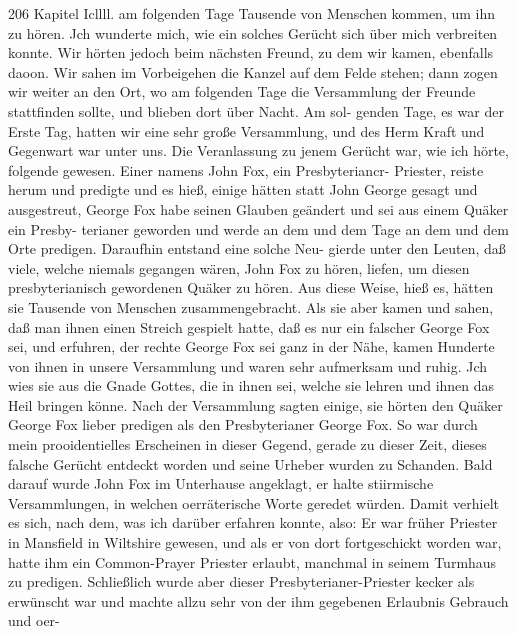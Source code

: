 206 Kapitel Icllll.
am folgenden Tage Tausende von Menschen kommen, um ihn zu
hören. Jch wunderte mich, wie ein solches Gerücht sich über
mich verbreiten konnte. Wir hörten jedoch beim nächsten
Freund, zu dem wir kamen, ebenfalls daoon. Wir sahen im
Vorbeigehen die Kanzel auf dem Felde stehen; dann zogen wir
weiter an den Ort, wo am folgenden Tage die Versammlung der
Freunde stattfinden sollte, und blieben dort über Nacht. Am sol-
genden Tage, es war der Erste Tag, hatten wir eine sehr große
Versammlung, und des Herm Kraft und Gegenwart war unter
uns. Die Veranlassung zu jenem Gerücht war, wie ich hörte,
folgende gewesen. Einer namens John Fox, ein Presbyteriancr-
Priester, reiste herum und predigte und es hieß, einige hätten
statt John George gesagt und ausgestreut, George Fox habe
seinen Glauben geändert und sei aus einem Quäker ein Presby-
terianer geworden und werde an dem und dem Tage an dem
und dem Orte predigen. Daraufhin entstand eine solche Neu-
gierde unter den Leuten, daß viele, welche niemals gegangen
wären, John Fox zu hören, liefen, um diesen presbyterianisch
gewordenen Quäker zu hören. Aus diese Weise, hieß es, hätten
sie Tausende von Menschen zusammengebracht. Als sie aber kamen
und sahen, daß man ihnen einen Streich gespielt hatte, daß es
nur ein falscher George Fox sei, und erfuhren, der rechte George
Fox sei ganz in der Nähe, kamen Hunderte von ihnen in unsere
Versammlung und waren sehr aufmerksam und ruhig. Jch wies
sie aus die Gnade Gottes, die in ihnen sei, welche sie lehren und
ihnen das Heil bringen könne. Nach der Versammlung sagten
einige, sie hörten den Quäker George Fox lieber predigen als den
Presbyterianer George Fox. So war durch mein prooidentielles
Erscheinen in dieser Gegend, gerade zu dieser Zeit, dieses falsche
Gerücht entdeckt worden und seine Urheber wurden zu Schanden.
Bald darauf wurde John Fox im Unterhause angeklagt, er
halte stiirmische Versammlungen, in welchen oerräterische Worte
geredet würden. Damit verhielt es sich, nach dem, was ich darüber
erfahren konnte, also: Er war früher Priester in Mansfield in
Wiltshire gewesen, und als er von dort fortgeschickt worden war,
hatte ihm ein Common-Prayer Priester erlaubt, manchmal in
seinem Turmhaus zu predigen. Schließlich wurde aber dieser
Presbyterianer-Priester kecker als erwünscht war und machte
allzu sehr von der ihm gegebenen Erlaubnis Gebrauch und oer-


